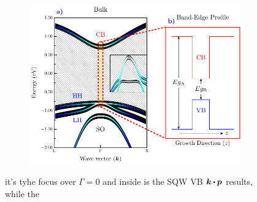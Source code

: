 \begin{figure}
	\centering
	\begin{subfigure}{\textwidth}
	\includegraphics[width=\textwidth]{../figures/chapter-2/numerical-calculations/out/band-edge}
	\label{subfig:chapter2-sec-numerical-calculations-band-edge-a}
	\label{subfig:chapter2-sec-numerical-calculations-band-edge-b}
	\end{subfigure}
	\caption{ it's tyhe focus over $\Gamma=0$ and inside is the SQW VB $\boldsymbol{k}\bigcdot \boldsymbol{p}$ results,  while the  }
	\label{fig:chapter2-sec-numerical-calculations-band-edge}
\end{figure}

